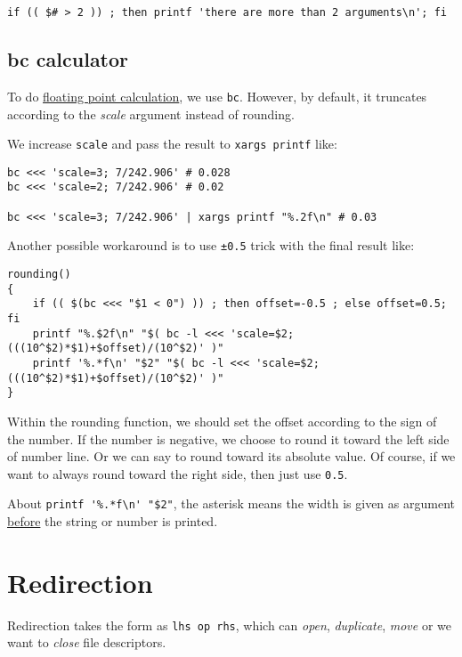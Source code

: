 \begin{lstlisting}
if (( $# > 2 )) ; then printf 'there are more than 2 arguments\n'; fi
\end{lstlisting}

\subsection{bc calculator}
\label{sec:bc-calculator}

To do \href{http://mywiki.wooledge.org/BashFAQ/022}{floating point
  calculation}, we use \lstinline|bc|. However, by default, it
truncates according to the \textit{scale} argument instead of
rounding.

We increase \lstinline|scale| and pass the result to
\lstinline|xargs printf| like:

\begin{lstlisting}
bc <<< 'scale=3; 7/242.906' # 0.028
bc <<< 'scale=2; 7/242.906' # 0.02

bc <<< 'scale=3; 7/242.906' | xargs printf "%.2f\n" # 0.03
\end{lstlisting}

Another possible workaround is to use \verb|±0.5| trick with the final
result like:

\begin{lstlisting}
rounding()
{
    if (( $(bc <<< "$1 < 0") )) ; then offset=-0.5 ; else offset=0.5; fi
    printf "%.$2f\n" "$( bc -l <<< 'scale=$2; (((10^$2)*$1)+$offset)/(10^$2)' )"
    printf '%.*f\n' "$2" "$( bc -l <<< 'scale=$2; (((10^$2)*$1)+$offset)/(10^$2)' )"
}
\end{lstlisting}

Within the rounding function, we should set the offset according
to the sign of the number. If the number is negative, we choose to
round it toward the left side of number line. Or we can say to
round toward its absolute value. Of course, if we want to always
round toward the right side, then just use \verb|0.5|.

About \lstinline|printf '%.*f\n' "$2"|, the asterisk means the width
is given as argument
\href{https://wiki.bash-hackers.org/commands/builtin/printf?s\%5b\%5d=printf}{before}
the string or number is printed.

\section{Redirection}
\label{sec:bash-redirection}

Redirection takes the form as \verb|lhs op rhs|, which can
\textit{open}, \textit{duplicate}, \textit{move} or we want to
\textit{close} file descriptors.

